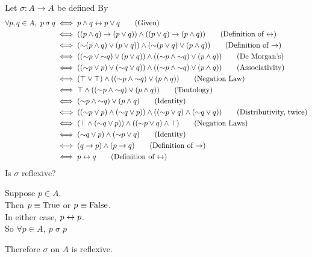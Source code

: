 \documentclass[a4paper, 11pt]{report}
\newcommand{\bisig}{\mathbin{\sigma}}
\begin{document}
Let $\bisig:A\to A$ be defined By
\begin{align*}
  \forall p,q\in A,\ p\bisig q &\iff p \land q \liff p\lor q \tag*{\text{(Given)}} \\
    &\iff ((p\land q)\lthen(p\lor q))\land((p\lor q)\lthen(p\land q)) \tag*{\text{(Definition of $\liff$)}} \\
    &\iff (\lnot(p\land q)\lor(p\lor q))\land(\lnot(p\lor q)\lor(p\land q)) \tag*{\text{(Definition of $\lthen$)}} \\
    &\iff ((\lnot p\lor\lnot q)\lor(p\lor q))\land((\lnot p\land\lnot q)\lor(p\land q)) \tag*{\text{(De Morgan's)}} \\
    &\iff ((\lnot p\lor p)\lor(\lnot q\lor q))\land((\lnot p\land\lnot q)\lor(p\land q)) \tag*{\text{(Associativity)}} \\
    &\iff (\top\lor\top)\land((\lnot p\land\lnot q)\lor(p\land q)) \tag*{\text{(Negation Law)}} \\
    &\iff \top\land((\lnot p\land\lnot q)\lor(p\land q)) \tag*{\text{(Tautology)}} \\
    &\iff (\lnot p\land\lnot q)\lor(p\land q) \tag*{\text{(Identity)}} \\
    &\iff ((\lnot p \lor p)\land(\lnot q\lor p))\land((\lnot p\lor q) \land (\lnot q\lor q)) \tag*{\text{(Distributivity, twice)}} \\
    &\iff (\top\land(\lnot q\lor p))\land((\lnot p\lor q) \land\top) \tag*{\text{(Negation Laws)}} \\
    &\iff (\lnot q\lor p)\land(\lnot p\lor q) \tag*{\text{(Identity)}} \\
    &\iff (q\lthen p)\land(p\lthen q) \tag*{\text{(Definition of $\lthen$)}} \\
    &\iff p\liff q \tag*{\text{(Definition of $\liff$)}}
\end{align*}
Is $\bisig$ reflexive?
\begin{list}{}{\setlength{\leftmargin}{1in}\setlength{\topsep}{2pt}}\item\relax
  Suppose $p\in A$. \\
  Then $p\equiv\text{True}$ or $p\equiv\text{False}$. \\
  In either case, $p\leftrightarrow p$. \\
  So $\forall p\in A,\ p\bisig p$

  Therefore $\bisig$ on $A$ is reflexive.
\end{list}
\end{document}
